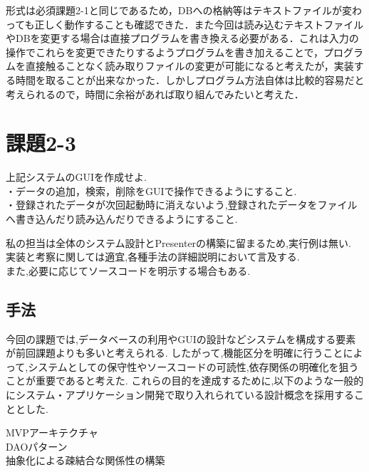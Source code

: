 \documentclass[12pt]{jarticle}
\begin{document}
形式は必須課題2-1と同じであるため，DBへの格納等はテキストファイルが変わっても正しく動作することも確認できた．また今回は読み込むテキストファイルやDBを変更する場合は直接プログラムを書き換える必要がある．これは入力の操作でこれらを変更できたりするようプログラムを書き加えることで，プログラムを直接触ることなく読み取りファイルの変更が可能になると考えたが，実装する時間を取ることが出来なかった．しかしプログラム方法自体は比較的容易だと考えられるので，時間に余裕があれば取り組んでみたいと考えた．

\section{課題2-3}
\begin{screen}
    上記システムのGUIを作成せよ.\\
    ・データの追加，検索，削除をGUIで操作できるようにすること. \\
    ・登録されたデータが次回起動時に消えないよう,登録されたデータをファイルへ書き込んだり読み込んだりできるようにすること.
\end{screen}
\noindent
私の担当は全体のシステム設計とPresenterの構築に留まるため,実行例は無い. \\
実装と考察に関しては適宜,各種手法の詳細説明において言及する. \\
また,必要に応じてソースコードを明示する場合もある. \\

\subsection{手法}
今回の課題では,データベースの利用やGUIの設計などシステムを構成する要素が前回課題よりも多いと考えられる.
したがって,機能区分を明確に行うことによって,システムとしての保守性やソースコードの可読性,依存関係の明確化を狙うことが重要であると考えた.
これらの目的を達成するために,以下のような一般的にシステム・アプリケーション開発で取り入れられている設計概念を採用することとした.
\begin{description}
    \item[MVPアーキテクチャ]
    \item[DAOパターン]
    \item[抽象化による疎結合な関係性の構築]
\end{description}
\end{document}
